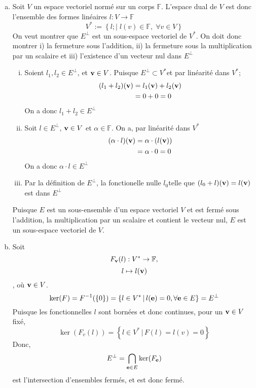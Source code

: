 \documentclass[letterpaper,12pt,oneside,final]{book}
\begin{document}
\begin{enumerate}[a)]

\item %
Soit \( V \) un espace vectoriel normé sur un corps \( \mathbb{F}  \). L'espace dual de \( V \) est donc l'ensemble des formes linéaires 
\( l: V \rightarrow \mathbb{F}   \)
\[ V^{*} := \left\{l;|\;l(v) \in \mathbb{F},\; \forall v \in V \right\}\]
On veut montrer que \( E^{\perp} \) est un sous-espace vectoriel de \( V^{*}\). On doit donc montrer 
i) la fermeture sous l'addition, ii) la fermeture sous la multiplication par un scalaire et iii) l'existence d'un vecteur nul dans \( E^{\perp} \)

\begin{enumerate}[i)]
\item 
Soient \( l_{1}, l_{2} \in E^{\perp} \), et \( \vb{v} \in V  \). 
Puisque \( E^{\perp} \subset V^{*} \)et par linéarité dans \( V^{*} \);
\begin{equation*}
\begin{split}
(l_{1} + l_{2})(\vb{v}) & = l_{1}(\vb{v}) + l_{2}(\vb{v}) \\ 
& = 0 + 0 = 0
\end{split}
\end{equation*}
On a donc \( l_{1} + l_{2} \in E^{\perp} \)
\item 
Soit \( l \in E^{\perp} \), \( \vb{v}\in V \) et \( \alpha \in \mathbb{F}  \). On a, par linéarité dans \( V^{*} \)
\begin{equation*}
\begin{split}
(\alpha\cdot l)(\vb{v}) & = \alpha \cdot  (l(\vb{v})) \\ 
& = \alpha \cdot 0 = 0
\end{split}
\end{equation*}
On a donc \( \alpha \cdot l \in E^{\perp} \)
\item Par la définition de \( E^{\perp} \), la fonctionelle nulle \( l_{0} \)telle que \( (l_{0}+l)(\vb{v}) = l(\vb{v}) \) est dans \( E^{\perp} \)

\end{enumerate}
Puisque \( E \) est un sous-ensemble d'un espace vectoriel \( V \) et est fermé sous l'addition, la multiplication 
par un scalaire et contient le vecteur nul, \( E \) est un sous-espace vectoriel de \( V \).
\item %
Soit
\[ F_{\vb{v}}(l) : V^{*} \rightarrow \mathbb{F}, \]
\[ l \mapsto l(\vb{v}) \]
, où \( \vb{v} \in V \).\\
\[ \ker(F) = F^{-1}(\left\{ 0 \right\}) = \left\{ l\in V^{*}\,|\, l(\vb{e}) = 0, \forall \vb{e} \in E \right\} =  E^{\perp}\]
Puisque les fonctionnelles \( l \) sont bornées et donc continues, pour un \( \vb{v} \in V \) fixé,
\[ \ker(F_{v}(l)) = \left\{ l \in V^{*}\,|\, F(l) = l(v) = 0 \right\}  \]
Donc, 
\[ E^{\perp} = \bigcap_{\vb{e} \in E} \ker(F_{\vb{e}}) \]
est l'intersection d'ensembles fermés, et est donc fermé. 


\end{enumerate}
\end{document}
